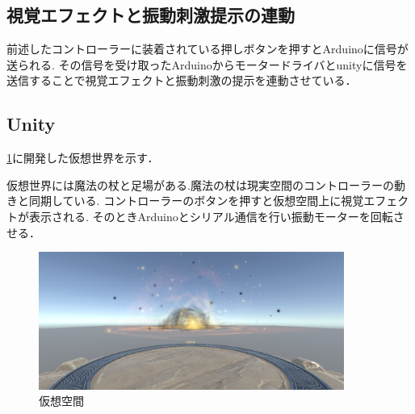 \subsection{視覚エフェクトと振動刺激提示の連動}
前述したコントローラーに装着されている押しボタンを押すとArduinoに信号が送られる.
その信号を受け取ったArduinoからモータードライバとunityに信号を送信することで視覚エフェクトと振動刺激の提示を連動させている．

\subsection{Unity}
\ref{virtualworld}に開発した仮想世界を示す．

仮想世界には魔法の杖と足場がある.魔法の杖は現実空間のコントローラーの動きと同期している.
コントローラーのボタンを押すと仮想空間上に視覚エフェクトが表示される.
そのときArduinoとシリアル通信を行い振動モーターを回転させる．

\begin{figure}[h]
\centering
\includegraphics[clip,width=10cm]{fig/unity.png}
\caption{仮想空間}\label{virtualworld}
\end{figure}

